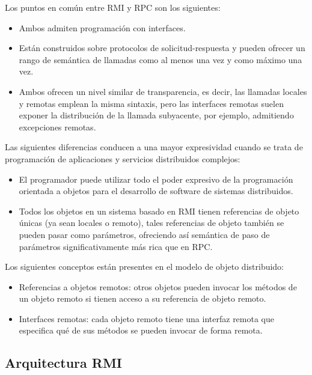 Los puntos en común entre RMI y RPC son los siguientes:
\begin{itemize}
	\item Ambos admiten programación con interfaces.
	\item  Están construidos sobre protocolos de solicitud-respuesta y pueden ofrecer un rango de semántica de llamadas como al menos una vez y como máximo una vez.
	\item Ambos ofrecen un nivel similar de transparencia, es decir, las llamadas locales y remotas emplean la misma sintaxis, pero las interfaces remotas suelen exponer la distribución de la llamada subyacente, por ejemplo, admitiendo excepciones remotas.
	
\end{itemize}

Las siguientes diferencias conducen a una mayor expresividad cuando se trata de programación de aplicaciones y servicios distribuidos complejos:

\begin{itemize}
	
	\item El programador puede utilizar todo el poder expresivo de la programación orientada a objetos para  el desarrollo de software de sistemas distribuidos.
	
	\item  Todos los objetos en un sistema basado en RMI tienen referencias de objeto únicas (ya sean locales o remoto), tales referencias de objeto también se pueden pasar como parámetros, ofreciendo así semántica de paso de parámetros significativamente más rica que en RPC.
\end{itemize}



Los siguientes  conceptos  están presentes en el modelo de objeto distribuido: 
\begin{itemize}
	\item Referencias a objetos remotos: otros objetos pueden invocar los métodos de un objeto remoto si tienen acceso a su referencia de objeto remoto. 
	\item  Interfaces remotas: cada objeto remoto tiene una interfaz remota que especifica qué de sus métodos se pueden invocar de forma remota.  
\end{itemize}


\subsection{Arquitectura RMI}


